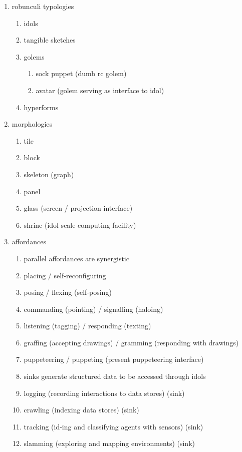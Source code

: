     \begin{enumerate}
        \item robunculi typologies
        \begin{enumerate}
            \item idols
            \item tangible sketches
            \item golems
            \begin{enumerate}
                \item sock puppet (dumb rc golem)
                \item avatar (golem serving as interface to idol)
            \end{enumerate}
            \item hyperforms
        \end{enumerate}
        \item morphologies
        \begin{enumerate}
            \item tile
            \item block
            \item skeleton (graph)
            \item panel
            \item glass (screen / projection interface)
            \item shrine (idol-scale computing facility)
        \end{enumerate}
        \item affordances
        \begin{enumerate}
            \item parallel affordances are synergistic
            \item placing / self-reconfiguring
            \item posing / flexing (self-posing)
            \item commanding (pointing) / signalling (haloing)
            \item listening (tagging) / responding (texting)
            \item graffing (accepting drawings) / gramming (responding with drawings)
            \item puppeteering / puppeting (present puppeteering interface)
            \item sinks generate structured data to be accessed through idols
            \item logging (recording interactions to data stores) (sink)
            \item crawling (indexing data stores) (sink)
            \item tracking (id-ing and classifying agents with sensors) (sink)
            \item slamming (exploring and mapping environments) (sink)
        \end{enumerate}
    \end{enumerate}


